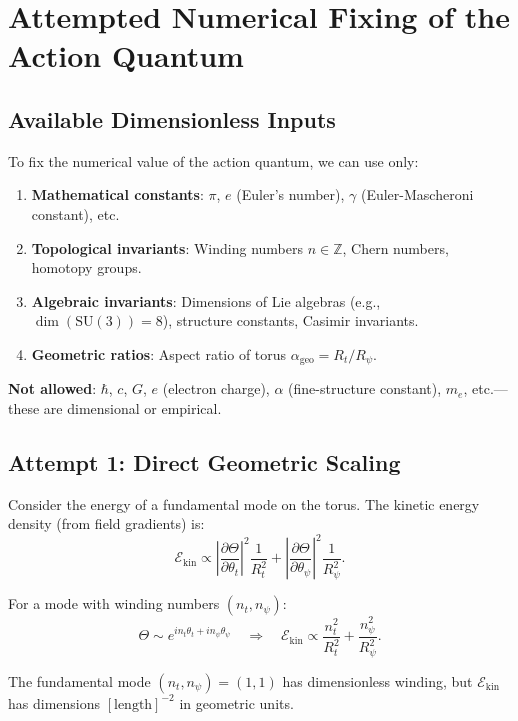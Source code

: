 \documentclass[12pt]{article}
\begin{document}
\section{Attempted Numerical Fixing of the Action Quantum}

\subsection{Available Dimensionless Inputs}

To fix the numerical value of the action quantum, we can use only:

\begin{enumerate}
\item \textbf{Mathematical constants}: $\pi$, $e$ (Euler's number), $\gamma$ (Euler-Mascheroni constant), etc.

\item \textbf{Topological invariants}: Winding numbers $n \in \mathbb{Z}$, Chern numbers, homotopy groups.

\item \textbf{Algebraic invariants}: Dimensions of Lie algebras (e.g., $\dim(\text{SU}(3)) = 8$), structure constants, Casimir invariants.

\item \textbf{Geometric ratios}: Aspect ratio of torus $\alpha_{\text{geo}} = R_t/R_\psi$.
\end{enumerate}

\textbf{Not allowed}: $\hbar$, $c$, $G$, $e$ (electron charge), $\alpha$ (fine-structure constant), $m_e$, etc.---these are dimensional or empirical.

\subsection{Attempt 1: Direct Geometric Scaling}

Consider the energy of a fundamental mode on the torus. The kinetic energy density (from field gradients) is:
\[
\mathcal{E}_{\text{kin}} \propto \left| \frac{\partial \Theta}{\partial \theta_t} \right|^2 \frac{1}{R_t^2} + \left| \frac{\partial \Theta}{\partial \theta_\psi} \right|^2 \frac{1}{R_\psi^2}.
\]

For a mode with winding numbers $(n_t, n_\psi)$:
\[
\Theta \sim e^{i n_t \theta_t + i n_\psi \theta_\psi} \quad \Rightarrow \quad \mathcal{E}_{\text{kin}} \propto \frac{n_t^2}{R_t^2} + \frac{n_\psi^2}{R_\psi^2}.
\]

The fundamental mode $(n_t, n_\psi) = (1, 1)$ has dimensionless winding, but $\mathcal{E}_{\text{kin}}$ has dimensions $[\text{length}]^{-2}$ in geometric units.
\end{document}
